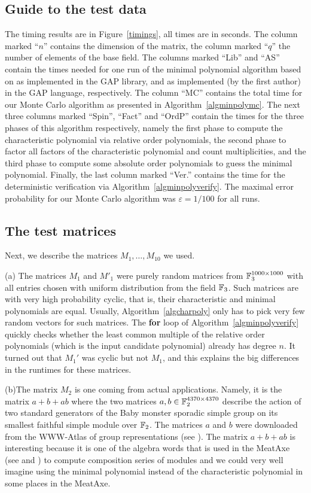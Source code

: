 \subsection{Guide to the test data}
The timing results
are in Figure~\ref{timings}, all times are in seconds. 
The column marked ``$n$'' contains the
dimension of the matrix, the column marked ``$q$'' the number of elements
of the base field. 
The columns marked ``Lib'' and ``AS'' contain the times needed for one run of 
the minimal polynomial algorithm based on \cite{Steel} as implemented in 
the {\sf GAP} library, and as implemented (by the first author) in the
{\sf GAP} language, respectively.
The column ``MC'' contains the total time for our 
Monte Carlo algorithm as presented in Algorithm~\ref{algminpolymc}.
The next three columns marked ``Spin'', ``Fact'' and ``OrdP''
contain the times for the three phases of this algorithm respectively, 
namely the first phase to compute the characteristic polynomial via
relative order polynomials, the second phase to factor all factors of
the characteristic polynomial and count multiplicities, and the third
phase to compute some absolute order polynomials to guess the minimal
polynomial. Finally, the last column marked ``Ver.'' contains
the time for the deterministic verification via 
Algorithm~\ref{algminpolyverify}.
The maximal error probability for our Monte Carlo algorithm was
$\varepsilon = 1/100$ for all runs.


\subsection{The test matrices}
Next, we describe the matrices $M_1, \ldots, M_{10}$ we used.

(a) \quad The matrices $M_1$ and $M'_1$ were purely random matrices from
$\mathbb{F}_3^{1000\times 1000}$ with all entries
chosen with uniform distribution from the field $\mathbb{F}_3$. Such matrices
are with very high probability cyclic, that is, their characteristic and
minimal polynomials are equal. Usually, Algorithm~\ref{algcharpoly} only
has to pick very few random vectors for such matrices. The {\bf for} loop
of Algorithm~\ref{algminpolyverify} quickly checks whether the least common multiple
of the relative order polynomials (which is the input candidate polynomial)
already has degree $n$. It turned out that $M_1'$ was cyclic but not $M_1$, 
and this explains the
big differences in the runtimes for these matrices.

(b)\quad The matrix $M_2$ is one coming from actual applications. Namely, it is
the matrix $a+b+ab$ where the two matrices $a,b \in \mathbb{F}_2^{4370 \times
4370}$ describe the action of two standard generators of the Baby monster
sporadic simple group on its smallest faithful simple module over $\mathbb{F}_2$.
The matrices $a$ and $b$ were downloaded from the WWW-Atlas of group
representations (see \cite{WWWAtlas}). The matrix $a+b+ab$ is
interesting because it is one of the algebra words that is used
in the {\sc MeatAxe} (see \cite{MeatAxeParker} and \cite{MeatAxeHoltRees})
to compute composition series of modules and
we could very well imagine using the minimal polynomial instead of
the characteristic polynomial in some places in the {\sc MeatAxe}.

